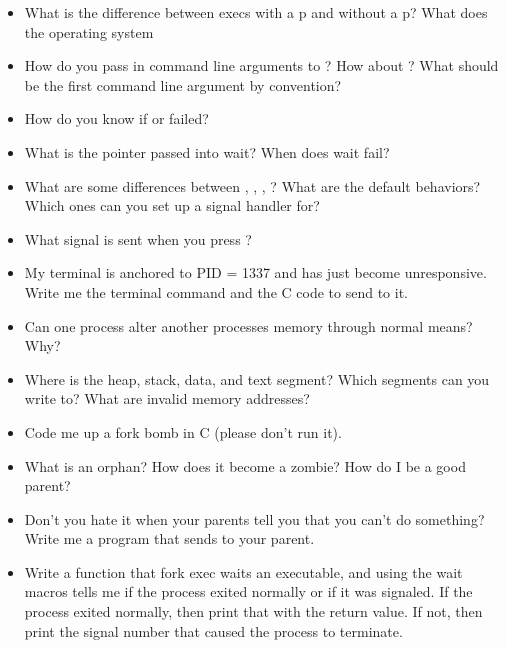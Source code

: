 \begin{itemize}
    \item
          What is the difference between execs with a p and without a p? What does the operating system
    \item
          How do you pass in command line arguments to ? How about ? What should be the first command line argument by convention?
    \item
          How do you know if  or  failed?
    \item
          What is the  pointer passed into wait? When does wait fail?
    \item
          What are some differences between , , , ? What are the default behaviors? Which ones can you set up a signal handler for?
    \item
          What signal is sent when you press ?
    \item
          My terminal is anchored to PID = 1337 and has just become unresponsive. Write me the terminal command and the C code to send  to it.
    \item
          Can one process alter another processes memory through normal means? Why?
    \item
          Where is the heap, stack, data, and text segment? Which segments can you write to? What are invalid memory addresses?
    \item
          Code me up a fork bomb in C (please don't run it).
    \item
          What is an orphan? How does it become a zombie? How do I be a good parent?
    \item
          Don't you hate it when your parents tell you that you can't do something? Write me a program that sends  to your parent.
    \item
          Write a function that fork exec waits an executable, and using the wait macros tells me if the process exited normally or if it was signaled. If the process exited normally, then print that with the return value. If not, then print the signal number that caused the process to terminate.
\end{itemize}



